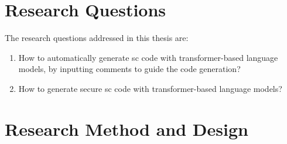 \section{Research Questions}
\label{sec:research-questions}
The research questions addressed in this thesis are:

\begin{enumerate}[label=\textbf{RQ\arabic*.}, leftmargin=1.5cm]
    \item How to automatically generate \acrlong{sc} code with transformer-based language models, by inputting comments to guide the code generation?
    \item How to generate secure \acrlong{sc} code with transformer-based language models?
\end{enumerate}

\section{Research Method and Design}
\label{sec:research-method-and-design}


